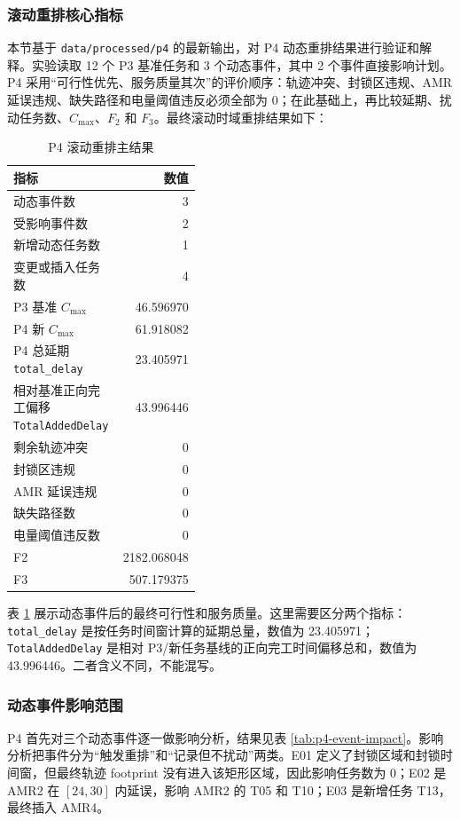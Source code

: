 \subsubsection{滚动重排核心指标}

本节基于 \verb|data/processed/p4| 的最新输出，对 P4 动态重排结果进行验证和解释。实验读取 12 个 P3 基准任务和 3 个动态事件，其中 2 个事件直接影响计划。P4 采用“可行性优先、服务质量其次”的评价顺序：轨迹冲突、封锁区违规、AMR 延误违规、缺失路径和电量阈值违反必须全部为 0；在此基础上，再比较延期、扰动任务数、$C_{\max}$、$F_2$ 和 $F_3$。最终滚动时域重排结果如下：

\begin{table}[H]
\centering
\small
\begin{tabular}{p{0.42\linewidth}r}
\toprule
指标 & 数值 \\
\midrule
动态事件数 & 3 \\
受影响事件数 & 2 \\
新增动态任务数 & 1 \\
变更或插入任务数 & 4 \\
P3 基准 $C_{\max}$ & 46.596970 \\
P4 新 $C_{\max}$ & 61.918082 \\
P4 总延期 \verb|total_delay| & 23.405971 \\
相对基准正向完工偏移 \verb|TotalAddedDelay| & 43.996446 \\
剩余轨迹冲突 & 0 \\
封锁区违规 & 0 \\
AMR 延误违规 & 0 \\
缺失路径数 & 0 \\
电量阈值违反数 & 0 \\
F2 & 2182.068048 \\
F3 & 507.179375 \\
\bottomrule
\end{tabular}
\caption{P4 滚动重排主结果}
\label{tab:p4-summary}
\end{table}

表 \ref{tab:p4-summary} 展示动态事件后的最终可行性和服务质量。这里需要区分两个指标：\verb|total_delay| 是按任务时间窗计算的延期总量，数值为 23.405971；\verb|TotalAddedDelay| 是相对 P3/新任务基线的正向完工时间偏移总和，数值为 43.996446。二者含义不同，不能混写。

\subsubsection{动态事件影响范围}

P4 首先对三个动态事件逐一做影响分析，结果见表 \ref{tab:p4-event-impact}。影响分析把事件分为“触发重排”和“记录但不扰动”两类。E01 定义了封锁区域和封锁时间窗，但最终轨迹 footprint 没有进入该矩形区域，因此影响任务数为 0；E02 是 AMR2 在 $[24,30]$ 内延误，影响 AMR2 的 T05 和 T10；E03 是新增任务 T13，最终插入 AMR4。

